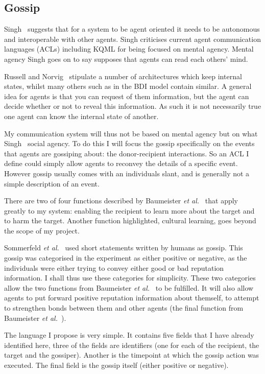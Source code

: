 \documentclass[]{final_report}
\begin{document}
\subsection{Gossip}
\label{subs:gossip}
Singh~\cite{singh1998agent} suggests that for a system to be agent oriented it needs to be autonomous and interoperable with other agents. Singh criticises current agent communication languages (ACLs) including KQML for being focused on mental agency. Mental agency Singh goes on to say supposes that agents can read each others' mind.\par
Russell and Norvig~\cite{russell2016artificial} stipulate a number of architectures which keep internal states, whilst many others such as in the BDI model contain similar. A general idea for agents is that you can request of them information, but the agent can decide whether or not to reveal this information. As such it is not necessarily true one agent can know the internal state of another.\par
My communication system will thus not be based on mental agency but on what Singh~\cite{singh1998agent} social agency. To do this I will focus the gossip specifically on the events that agents are gossiping about: the donor-recipient interactions. So an ACL I define could simply allow agents to reconvey the details of a specific event. However gossip usually comes with an individuals slant, and is generally not a simple description of an event.\par
There are two of four functions described by Baumeister \textit{et al.}~\cite{baumeister2004gossip} that apply greatly to my system: enabling the recipient to learn more about the target and to harm the target. Another function highlighted, cultural learning, goes beyond the scope of my project.\par
Sommerfeld \textit{et al.}~\cite{gossip_alt} used short statements written by humans as gossip. This gossip was categorised in the experiment as either positive or negative, as the individuals were either trying to convey either good or bad reputation information. I shall thus use these categories for simplicity. These two categories allow the two functions from Baumeister \textit{et al.}~\cite{baumeister2004gossip} to be fulfilled. It will also allow agents to put forward positive reputation information about themself, to attempt to strengthen bonds between them and other agents (the final function from Baumeister \textit{et al.}~\cite{baumeister2004gossip}).\par
The language I propose is very simple. It contains five fields that I have already identified here, three of the fields are identifiers (one for each of the recipient, the target and the gossiper). Another is the timepoint at which the gossip action was executed. The final field is the gossip itself (either positive or negative).\par
\end{document}
